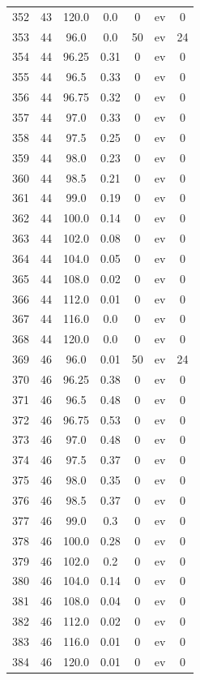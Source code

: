 \documentclass[12pt,a4paper]{article}
\begin{document}
\begin{tabular}{r|cccccc}
	352 & 43 & 120.0 & 0.0 & 0 & ev & 0 \\
	353 & 44 & 96.0 & 0.0 & 50 & ev & 24 \\
	354 & 44 & 96.25 & 0.31 & 0 & ev & 0 \\
	355 & 44 & 96.5 & 0.33 & 0 & ev & 0 \\
	356 & 44 & 96.75 & 0.32 & 0 & ev & 0 \\
	357 & 44 & 97.0 & 0.33 & 0 & ev & 0 \\
	358 & 44 & 97.5 & 0.25 & 0 & ev & 0 \\
	359 & 44 & 98.0 & 0.23 & 0 & ev & 0 \\
	360 & 44 & 98.5 & 0.21 & 0 & ev & 0 \\
	361 & 44 & 99.0 & 0.19 & 0 & ev & 0 \\
	362 & 44 & 100.0 & 0.14 & 0 & ev & 0 \\
	363 & 44 & 102.0 & 0.08 & 0 & ev & 0 \\
	364 & 44 & 104.0 & 0.05 & 0 & ev & 0 \\
	365 & 44 & 108.0 & 0.02 & 0 & ev & 0 \\
	366 & 44 & 112.0 & 0.01 & 0 & ev & 0 \\
	367 & 44 & 116.0 & 0.0 & 0 & ev & 0 \\
	368 & 44 & 120.0 & 0.0 & 0 & ev & 0 \\
	369 & 46 & 96.0 & 0.01 & 50 & ev & 24 \\
	370 & 46 & 96.25 & 0.38 & 0 & ev & 0 \\
	371 & 46 & 96.5 & 0.48 & 0 & ev & 0 \\
	372 & 46 & 96.75 & 0.53 & 0 & ev & 0 \\
	373 & 46 & 97.0 & 0.48 & 0 & ev & 0 \\
	374 & 46 & 97.5 & 0.37 & 0 & ev & 0 \\
	375 & 46 & 98.0 & 0.35 & 0 & ev & 0 \\
	376 & 46 & 98.5 & 0.37 & 0 & ev & 0 \\
	377 & 46 & 99.0 & 0.3 & 0 & ev & 0 \\
	378 & 46 & 100.0 & 0.28 & 0 & ev & 0 \\
	379 & 46 & 102.0 & 0.2 & 0 & ev & 0 \\
	380 & 46 & 104.0 & 0.14 & 0 & ev & 0 \\
	381 & 46 & 108.0 & 0.04 & 0 & ev & 0 \\
	382 & 46 & 112.0 & 0.02 & 0 & ev & 0 \\
	383 & 46 & 116.0 & 0.01 & 0 & ev & 0 \\
	384 & 46 & 120.0 & 0.01 & 0 & ev & 0 \\

\end{tabular}
\end{document}

